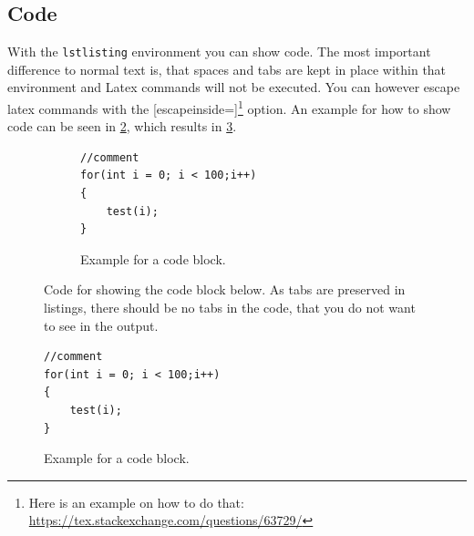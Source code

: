 \subsection{Code}
\label{texbas:code}
With the \texttt{lstlisting} environment you can show code. The most important difference to normal text is, that spaces and tabs are kept in place within that environment and Latex commands will not be executed. You can however escape latex commands with the [escapeinside={}{}]\footnote{Here is an example on how to do that: \url{https://tex.stackexchange.com/questions/63729/}} option. An example for how to show code can be seen in \ref{fig:code_for_code}, which results in \ref{code:example}.

\begin{figure}[ht]
	\begin{TeXlstlisting}
\begin{figure}[htbp]
	\begin{lstlisting}
//comment
for(int i = 0; i < 100;i++)
{
	test(i);
}
	\end{lstlisting}
	\caption{Example for a code block.}
	\label{code:example}
\end{figure}
	\end{TeXlstlisting}
	\caption[Code for showing code.]{Code for showing the code block below. As tabs are preserved in listings, there should be no tabs in the code, that you do not want to see in the output.}
	\label{fig:code_for_code}
\end{figure}

\begin{figure}[ht]
	\begin{lstlisting}
//comment
for(int i = 0; i < 100;i++)
{
	test(i);
}
	\end{lstlisting}
	\caption{Example for a code block.}
	\label{code:example}
\end{figure}

